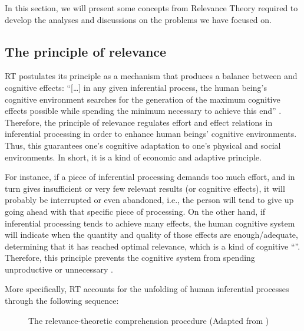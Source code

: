 \documentclass[output=paper]{langsci/langscibook}
\begin{document}
In this section, we will present some concepts from Relevance Theory required to develop the analyses and discussions on the problems we have focused on.


\subsection{The principle of relevance\label{alves:sec:ThePrincipleOfRelevance}}

RT postulates its principle as a mechanism that produces a balance between  and cognitive effects: ``[\ldots] in any given inferential process, the human being's cognitive environment searches for the generation of the maximum cognitive effects possible while spending the minimum  necessary to achieve this end'' \citep[109]{alves2013}. Therefore, the principle of relevance regulates effort and effect relations in inferential processing in order to enhance human beings' cognitive environments. Thus, this guarantees one's cognitive adaptation to one's physical and social environments. In short, it is a kind of economic and adaptive principle.


For instance, if a piece of inferential processing demands too much effort, and in turn gives insufficient or very few relevant results (or cognitive effects), it will probably be interrupted or even abandoned, i.e., the person will tend to give up going ahead with that specific piece of processing. On the other hand, if inferential processing tends to achieve many effects, the human cognitive system will indicate when the quantity and quality of those effects are enough/adequate, determining that it has reached optimal relevance, which is a kind of cognitive ``''. Therefore, this principle prevents the cognitive system from spending unproductive or unnecessary .



More specifically, RT accounts for the unfolding of human inferential processes through the following sequence:


  
\begin{figure}

 \caption{The relevance-theoretic comprehension procedure (Adapted from \citealt[6]{alves2003})}
 \label{sarto:fig:1}
\end{figure} 
\end{document}
